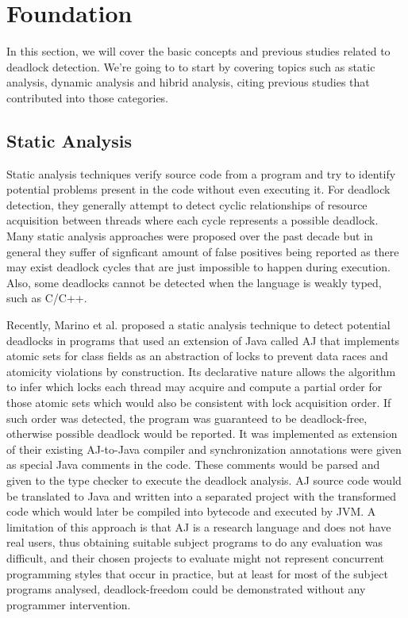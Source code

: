 \section{Foundation}

In this section, we will cover the basic concepts and previous studies related to deadlock detection. We're going to to start by covering topics such as static analysis, dynamic analysis and hibrid analysis, citing previous studies that contributed into those categories.

\subsection{Static Analysis}

Static analysis techniques verify source code from a program and try to identify potential problems present in the code without even executing it.
For deadlock detection, they generally attempt to detect cyclic relationships of resource acquisition between threads where each cycle represents a possible deadlock.
Many static analysis approaches were proposed over the past decade \cite{dawson}\cite{chand}\cite{vivek}\cite{praun}\cite{cormac}\cite{williams}
but in general they suffer of signficant amount of false positives being reported as there may exist deadlock cycles that are just impossible to happen during execution.
Also, some deadlocks cannot be detected when the language is weakly typed, such as C/C++.

Recently, Marino et al. \cite{marino} proposed a static analysis technique to detect potential deadlocks in programs that
used an extension of Java called AJ that implements atomic sets for class fields as an abstraction of locks to prevent data races
and atomicity violations by construction. Its declarative nature allows the algorithm to infer which locks each thread may acquire and
compute a partial order for those atomic sets which would also be consistent with lock acquisition order.
If such order was detected, the program was guaranteed to be deadlock-free, otherwise possible deadlock would be reported.
It was implemented as extension of their existing AJ-to-Java compiler and synchronization annotations were given as special Java comments in the code.
These comments would be parsed and given to the type checker to execute the deadlock analysis. AJ source code would be translated to Java and written into a separated project
with the transformed code which would later be compiled into bytecode and executed by JVM. A limitation of this approach is that AJ is a research language
and does not have real users, thus obtaining suitable subject programs to do any evaluation was difficult, and their chosen projects to evaluate might not
represent concurrent programming styles that occur in practice, but at least for most of the subject programs analysed, deadlock-freedom could be demonstrated
without any programmer intervention.

